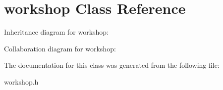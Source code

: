 \hypertarget{classworkshop}{}\section{workshop Class Reference}
\label{classworkshop}


Inheritance diagram for workshop\+:


Collaboration diagram for workshop\+:


The documentation for this class was generated from the following file\+:\begin{DoxyCompactItemize}
\item 
workshop.\+h\end{DoxyCompactItemize}
